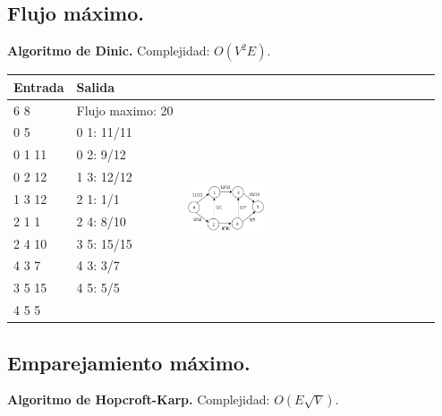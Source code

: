 \documentclass[10pt, letterpaper, twoside]{article}
\begin{document}
\subsection{Flujo máximo.}

\textbf{Algoritmo de Dinic.} Complejidad: $O(V^2 E)$.



\begin{tabular}{|p{4cm}|p{4cm}|p{7.5cm}|}
\hline
\textbf{Entrada} & \textbf{Salida} & \\ \hline
6 8    & Flujo maximo: 20 & \multirow{10}{*}{\includegraphics[width = 0.33\textwidth]{Grafos/Imagenes/MaxFlow.png}} \\
0 5    & 0 1: 11/11 & \\ 
0 1 11 & 0 2: 9/12  & \\
0 2 12 & 1 3: 12/12 & \\
1 3 12 & 2 1: 1/1   & \\
2 1 1  & 2 4: 8/10  & \\
2 4 10 & 3 5: 15/15 & \\
4 3 7  & 4 3: 3/7   & \\
3 5 15 & 4 5: 5/5   & \\
4 5 5  &            & \\ \hline
\end{tabular}

\subsection{Emparejamiento máximo.}

\textbf{Algoritmo de Hopcroft-Karp.} Complejidad: $O(E \sqrt{V})$.


\end{document}
